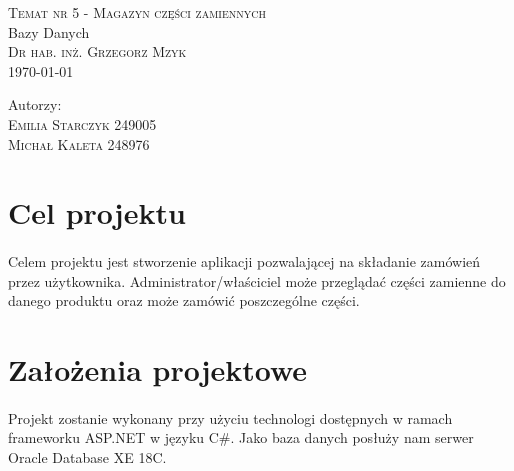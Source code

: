 \documentclass{article}
\begin{document}
\begin{titlepage}
   \vspace*{80mm}
   \centering
   \noindent\makebox[\linewidth]{\rule{\paperwidth}{0.4pt}}
   \LARGE{\textsc{Temat nr 5 - Magazyn części zamiennych}\\}
   Bazy Danych\\
   \textsc{\large Dr hab. inż. Grzegorz Mzyk\\}
   \large \today \\
   \noindent\makebox[\linewidth]{\rule{\paperwidth}{0.4pt}}
   \begin{minipage}[l]{0.3\textwidth}
      \vspace{0.4cm}
      Autorzy:\\
      \textsc{\large Emilia Starczyk} 249005\\
      \textsc{\large Michał Kaleta} 248976\\
   \end{minipage}

   \vfill
\end{titlepage}
\section{Cel projektu}
\paragraph{}
Celem projektu jest stworzenie aplikacji pozwalającej na składanie zamówień
przez użytkownika. Administrator/właściciel może przeglądać części zamienne do
danego produktu oraz może zamówić poszczególne części.
\section{Założenia projektowe}
\paragraph{}
Projekt zostanie wykonany przy użyciu technologi dostępnych w ramach frameworku
ASP.NET w języku C\#. Jako baza danych posłuży nam serwer Oracle Database XE 18C.
\end{document}
